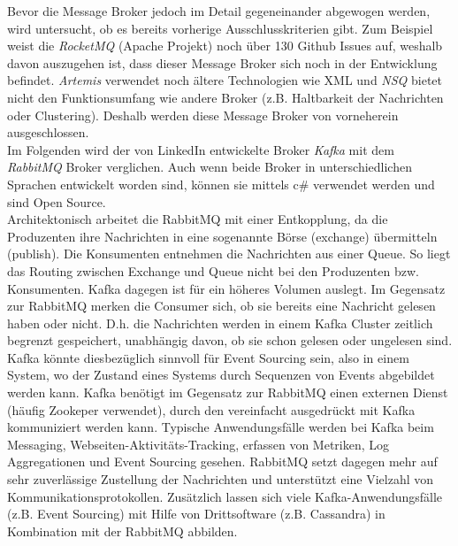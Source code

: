 {Bevor die Message Broker jedoch im Detail gegeneinander abgewogen werden, wird untersucht, ob es bereits vorherige Ausschlusskriterien gibt. Zum Beispiel weist die \textit{RocketMQ} (Apache Projekt) noch über 130 Github Issues auf, weshalb davon auszugehen ist, dass dieser Message Broker sich noch in der Entwicklung befindet. \textit{Artemis} verwendet noch ältere Technologien wie XML und \textit{NSQ} bietet nicht den Funktionsumfang wie andere Broker (z.B. Haltbarkeit der Nachrichten oder Clustering).\cite{messageQueue2018} Deshalb werden diese Message Broker von vorneherein ausgeschlossen. \\ %

Im Folgenden wird der von LinkedIn entwickelte Broker \textit{Kafka} mit dem \textit{RabbitMQ} Broker verglichen. Auch wenn beide Broker in unterschiedlichen Sprachen entwickelt worden sind, können sie mittels c\# verwendet werden und sind Open Source.\\

Architektonisch arbeitet die RabbitMQ mit einer Entkopplung, da die Produzenten ihre Nachrichten in eine sogenannte Börse (exchange) übermitteln (publish). Die Konsumenten entnehmen die Nachrichten aus einer Queue. So liegt das Routing zwischen Exchange und Queue nicht bei den Produzenten bzw. Konsumenten. Kafka dagegen ist für ein höheres Volumen auslegt. Im Gegensatz zur RabbitMQ merken die Consumer sich, ob sie bereits eine Nachricht gelesen haben oder nicht. D.h. die Nachrichten werden in einem Kafka Cluster zeitlich begrenzt gespeichert, unabhängig davon, ob sie schon gelesen oder ungelesen sind. Kafka könnte diesbezüglich sinnvoll für Event Sourcing sein, also in einem System, wo der Zustand eines Systems durch Sequenzen von Events abgebildet werden kann.\cite{richardson2019mic_pattern} Kafka benötigt im Gegensatz zur RabbitMQ einen externen Dienst (häufig Zookeper verwendet), durch den vereinfacht ausgedrückt mit Kafka kommuniziert werden kann.\cite{understandingRabbitMQApacheKafka}\cite{kafkaUseCases} Typische Anwendungsfälle werden bei Kafka beim Messaging, Webseiten-Aktivitäts-Tracking, erfassen von Metriken, Log Aggregationen und Event Sourcing gesehen.\cite{kafkaUseCases} RabbitMQ setzt dagegen mehr auf sehr zuverlässige Zustellung der Nachrichten und unterstützt eine Vielzahl von Kommunikationsprotokollen. Zusätzlich lassen sich viele Kafka-Anwendungsfälle (z.B. Event Sourcing) mit Hilfe von Drittsoftware (z.B. Cassandra) in Kombination mit der RabbitMQ abbilden.\cite{understandingRabbitMQApacheKafka}\\

}
